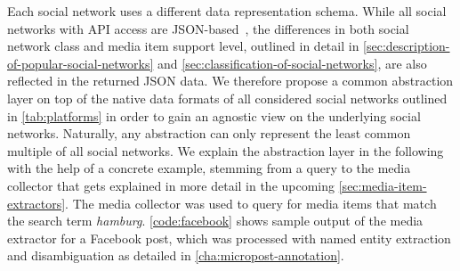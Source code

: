 Each social network uses a different data representation schema.
While all social networks with API access are
JSON-based~\cite{crockford2006json}, the differences in both 
social network class and media item support level,
outlined in detail in
\autoref{sec:description-of-popular-social-networks} and
\autoref{sec:classification-of-social-networks},
are also reflected in the returned JSON data.
We therefore propose a common abstraction layer 
on top of the native data formats of all considered social networks
outlined in \autoref{tab:platforms} in order to gain
an agnostic view on the underlying social networks.
Naturally, any abstraction can only represent the
least common multiple of all social networks.
We explain the abstraction layer in the following
with the help of a concrete example,
stemming from a query to the media collector
that gets explained in more detail
in the upcoming \autoref{sec:media-item-extractors}.
The media collector was used to query for media items
that match the search term \emph{hamburg}.
\autoref{code:facebook} shows sample output of the media extractor
for a Facebook post, which was processed
with named entity extraction and disambiguation 
as detailed in \autoref{cha:micropost-annotation}.

